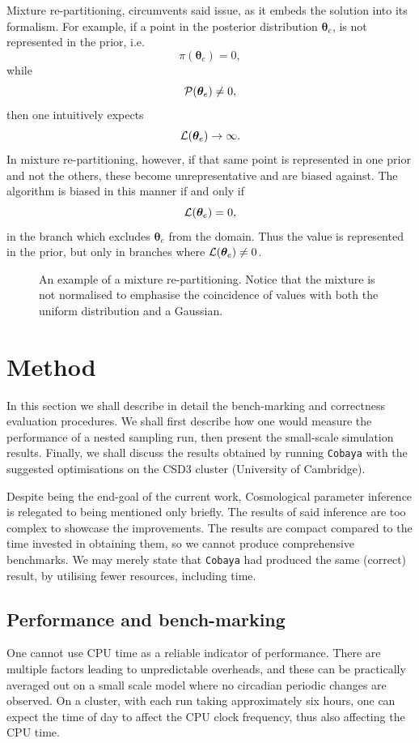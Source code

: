 \documentclass[usenatbib]{mnras}
\begin{document}
Mixture re-partitioning, circumvents said issue, as it embeds the
solution into its formalism. For example, if a point in the
posterior distribution \(\bm{\theta}_{e}\), is not represented in
the prior, i.e.  \[\pi(\bm{\theta}_{e}) = 0,\] while \[{\cal
	P}(\bm{\theta}_{e}) \ne 0,\] then one intuitively expects \[{\cal
	L}(\bm{\theta}_{e}) \rightarrow \infty.\] In mixture
re-partitioning, however, if that same point is represented in one
prior and not the others, these become unrepresentative and are
biased against. The algorithm is biased in this manner if and only
if \[{\cal L}(\bm{\theta}_{e}) = 0,\] in the branch which excludes
\(\bm{\theta}_{e}\) from the domain. Thus the value is represented
in the prior, but only in branches where \({\cal
	L}(\bm{\theta}_{e}) \ne 0\).

\begin{figure}
 
\caption{An example of a mixture re-partitioning. Notice that the mixture is not normalised to emphasise the coincidence of values with both the uniform distribution and a Gaussian. \label{fig:mixture}}
\end{figure}



\section{Method}
\label{sec:org4fccf24}
In this section we shall describe in detail the bench-marking and
correctness evaluation procedures. We shall first describe how one
would measure the performance of a nested sampling run, then present
the small-scale simulation results. Finally, we shall discuss the
results obtained by running \texttt{Cobaya} with the suggested
optimisations on the CSD3 cluster (University of Cambridge).

Despite being the end-goal of the current work, Cosmological
parameter inference is relegated to being mentioned only
briefly. The results of said inference are too complex to showcase
the improvements. The results are compact compared to the time
invested in obtaining them, so we cannot produce comprehensive
benchmarks. We may merely state that \texttt{Cobaya} had produced the same
(correct) result, by utilising fewer resources, including time.


\subsection{Performance and bench-marking}
\label{sec:org26487ac}
One cannot use CPU time as a reliable indicator of
performance. There are multiple factors leading to unpredictable
overheads, and these can be practically averaged out on a small
scale model where no circadian periodic changes are observed. On a
cluster, with each run taking approximately six hours, one can
expect the time of day to affect the CPU clock frequency, thus also
affecting the CPU time.
\end{document}

